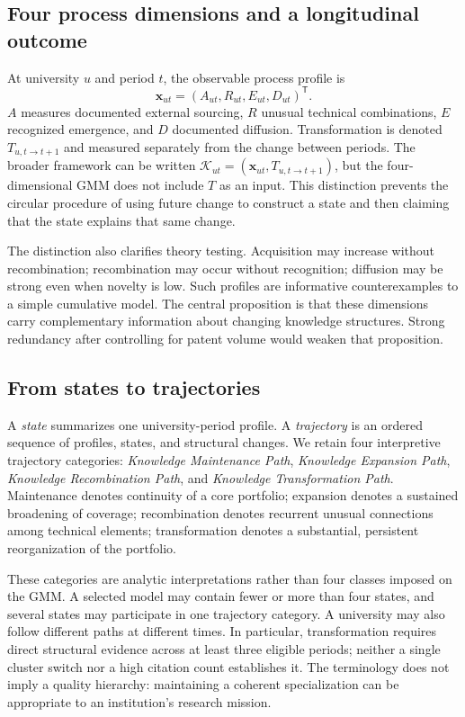 \subsection{Four process dimensions and a longitudinal outcome}
At university $u$ and period $t$, the observable process profile is
\begin{equation}
 \mathbf{x}_{ut}=(A_{ut},R_{ut},E_{ut},D_{ut})^{\mathsf T}.
 \label{eq:profile}
\end{equation}
$A$ measures documented external sourcing, $R$ unusual technical combinations,
$E$ recognized emergence, and $D$ documented diffusion. Transformation is denoted
$T_{u,t\rightarrow t+1}$ and measured separately from the change between periods.
The broader framework can be written
$\mathcal{K}_{ut}=(\mathbf{x}_{ut},T_{u,t\rightarrow t+1})$,
but the four-dimensional GMM does not include $T$ as an input. This distinction
prevents the circular procedure of using future change to construct a state and
then claiming that the state explains that same change.

The distinction also clarifies theory testing. Acquisition may increase without
recombination; recombination may occur without recognition; diffusion may be
strong even when novelty is low. Such profiles are informative counterexamples
to a simple cumulative model. The central proposition is that these dimensions
carry complementary information about changing knowledge structures. Strong
redundancy after controlling for patent volume would weaken that proposition.

\subsection{From states to trajectories}
A \emph{state} summarizes one university-period profile. A \emph{trajectory} is an
ordered sequence of profiles, states, and structural changes. We retain four
interpretive trajectory categories: \emph{Knowledge Maintenance Path},
\emph{Knowledge Expansion Path}, \emph{Knowledge Recombination Path}, and
\emph{Knowledge Transformation Path}. Maintenance denotes continuity of a core
portfolio; expansion denotes a sustained broadening of coverage; recombination
denotes recurrent unusual connections among technical elements; transformation
denotes a substantial, persistent reorganization of the portfolio.

These categories are analytic interpretations rather than four classes imposed
on the GMM. A selected model may contain fewer or more than four states, and
several states may participate in one trajectory category. A university may also
follow different paths at different times. In particular, transformation requires
direct structural evidence across at least three eligible periods; neither a
single cluster switch nor a high citation count establishes it. The terminology
does not imply a quality hierarchy: maintaining a coherent specialization can be
appropriate to an institution's research mission.

